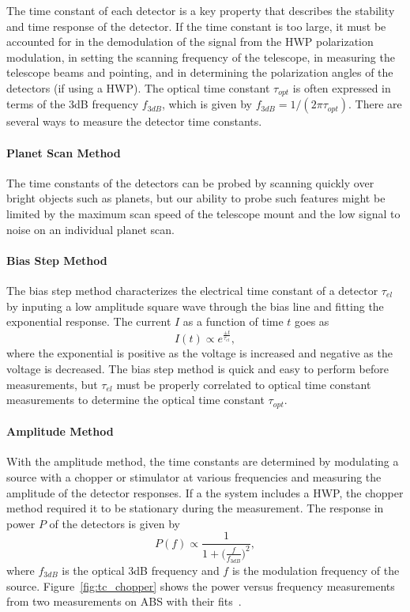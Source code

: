 The time constant of each detector is a key property that describes the stability and time response of the detector. If the time constant is too large, it must be accounted for in the demodulation of the signal from the HWP polarization modulation, in setting the scanning frequency of the telescope, in measuring the telescope beams and pointing, and in determining the polarization angles of the detectors (if using a HWP). The optical time constant $\tau_{opt}$ is often expressed in terms of the 3dB frequency $f_{3 dB}$, which is given by $f_{3dB}=1/(2\pi \tau_{opt})$. There are several ways to measure the detector time constants.

\paragraph{Planet Scan Method} The time constants of the detectors can be probed by scanning quickly over bright objects such as planets, but our ability to probe such features might be limited by the maximum scan speed of the telescope mount and the low signal to noise on an individual planet scan.

\paragraph{Bias Step Method} The bias step method characterizes the electrical time constant of a detector $\tau_{el}$ by inputing a low amplitude square wave through the bias line and fitting the exponential response. The current $I$ as a function of time $t$ goes as
\begin{equation}
I(t) \propto e^{\frac{\pm t}{\tau_{el}}},
\end{equation}
where the exponential is positive as the voltage is increased and negative as the voltage is decreased. The bias step method is quick and easy to perform before measurements, but $\tau_{el}$ must be properly correlated to optical time constant measurements to determine the optical time constant $\tau_{opt}$.

\paragraph{Amplitude Method} With the amplitude method, the time constants are determined by modulating a source with a chopper or stimulator at various frequencies and measuring the amplitude of the detector responses. If a the system includes a HWP, the chopper method required it to be stationary during the measurement. The response in power $P$ of the detectors is given by
\begin{equation}\label{eqn:tc_amp}
P(f) \propto \frac{1}{1+\Big(\frac{f}{f_{3dB}}\Big)^2},
\end{equation}
where $f_{3dB}$ is the optical 3dB frequency and $f$ is the modulation frequency of the source. Figure~\ref{fig:tc_chopper} shows the power versus frequency measurements from two measurements on ABS with their fits~\cite{Simon_Thesis_2016}.

